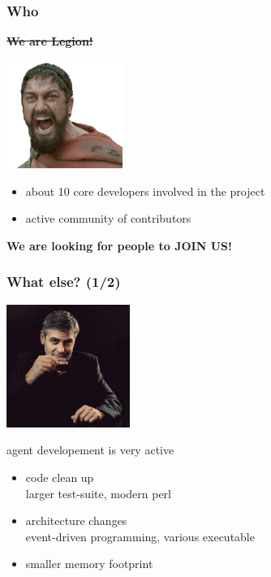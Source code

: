 \documentclass{beamer}
\begin{document}
\begin{frame}
    \frametitle{Who}

    \sout{\bf{We are Legion!}}
    \begin{center}
    \includegraphics[height=3.5cm]{./pics/sparta.jpg}
    \end{center}

    \begin{itemize}
    \item about 10 core developers involved in the project
    \item active community of contributors
    \end{itemize}

    \pause
    \bf{We are looking for people to JOIN US!}
\end{frame}


\begin{frame}
    \frametitle{What else? (1/2)}

    \begin{center}
    \includegraphics[height=4.0cm]{pics/whatelse.jpg}
    \end{center}

    \pause

    \begin{block}{agent developement is very active}
        \begin{itemize}
            \item code clean up\\
            {\small larger test-suite, modern perl}
            \item architecture changes\\
            {\small event-driven programming, various executable}
            \item smaller memory footprint
        \end{itemize}
    \end{block}
\end{frame}
\end{document}
